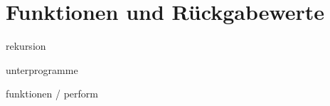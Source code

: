 \section{Funktionen und Rückgabewerte}\label{sec:functionsAndReturnValues}

rekursion

unterprogramme

funktionen / perform

